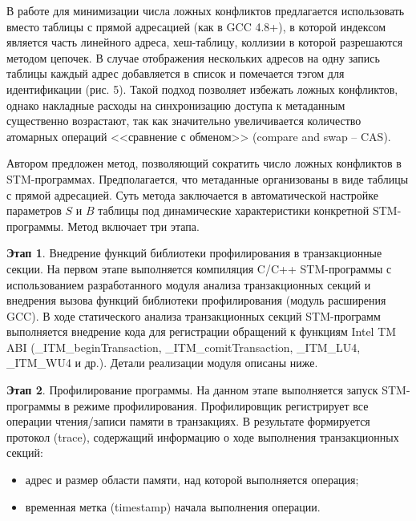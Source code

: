 \todo {
}

В работе \cite{zilles_rajwar_false_conf} для минимизации числа ложных конфликтов предлагается использовать вместо таблицы с прямой адресацией (как в GCC 4.8+), в которой индексом является часть линейного адреса, хеш-таблицу, коллизии в которой разрешаются методом цепочек. В случае отображения нескольких адресов на одну запись таблицы каждый адрес добавляется в список и помечается тэгом для идентификации (рис. 5). Такой подход позволяет избежать ложных конфликтов, однако накладные расходы на синхронизацию доступа к метаданным существенно возрастают, так как значительно увеличивается количество атомарных операций <<сравнение с обменом>> (compare and swap -- CAS).

\todo {
}

Автором предложен метод, позволяющий сократить число ложных конфликтов в STM-программах. Предполагается, что метаданные организованы в виде таблицы с прямой адресацией. Суть метода заключается в автоматической настройке параметров $S$ и $B$ таблицы под динамические характеристики конкретной STM-программы. Метод включает три этапа.

\textbf{Этап 1}. Внедрение функций библиотеки профилирования в транзакционные секции. На первом этапе выполняется компиляция C/C++ STM-программы с использованием разработанного модуля анализа транзакционных секций и внедрения вызова функций библиотеки профилирования (модуль расширения GCC). В ходе статического анализа транзакционных секций STM-программ выполняется внедрение кода для регистрации обращений к функциям Intel TM ABI (\_ITM\_beginTransaction, \_ITM\_comitTransaction, \_ITM\_LU4, \_ITM\_WU4 и др.). Детали реализации модуля описаны ниже.

\textbf{Этап 2}. Профилирование программы. На данном этапе выполняется запуск STM-программы в режиме профилирования. Профилировщик регистрирует все операции чтения/записи памяти в транзакциях. В результате формируется протокол (trace), содержащий информацию о ходе выполнения транзакционных секций: 
\begin{itemize}
\item адрес и размер области памяти, над которой выполняется операция;
\item временная метка (timestamp) начала выполнения операции.
\end{itemize}

